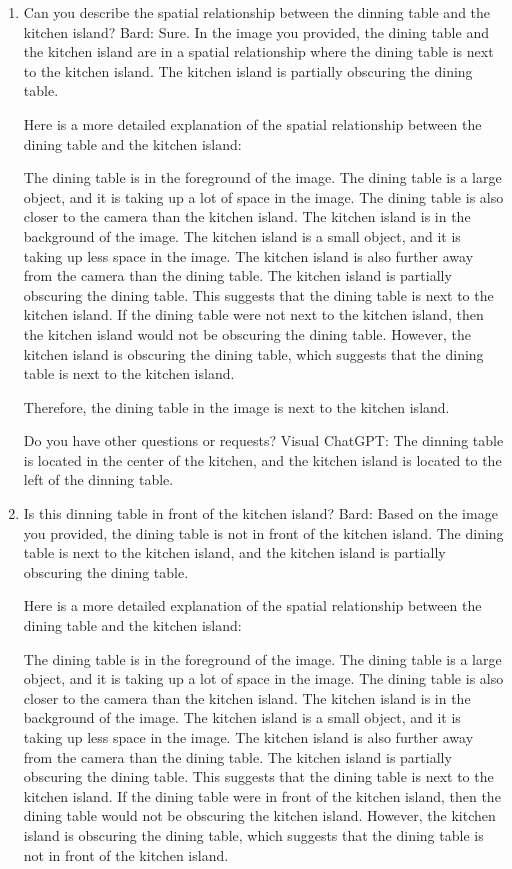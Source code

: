 \begin{enumerate}
    \item Can you describe the spatial relationship between the dinning table and the kitchen island?
    \subitem Bard: 
    Sure. In the image you provided, the dining table and the kitchen island are in a spatial relationship where the dining table is next to the kitchen island. The kitchen island is partially obscuring the dining table.
    
    Here is a more detailed explanation of the spatial relationship between the dining table and the kitchen island:
    
    The dining table is in the foreground of the image. The dining table is a large object, and it is taking up a lot of space in the image. The dining table is also closer to the camera than the kitchen island.
    The kitchen island is in the background of the image. The kitchen island is a small object, and it is taking up less space in the image. The kitchen island is also further away from the camera than the dining table.
    The kitchen island is partially obscuring the dining table. This suggests that the dining table is next to the kitchen island.
    If the dining table were not next to the kitchen island, then the kitchen island would not be obscuring the dining table. However, the kitchen island is obscuring the dining table, which suggests that the dining table is next to the kitchen island.
    
    Therefore, the dining table in the image is next to the kitchen island.
    
    Do you have other questions or requests?
    \subitem Visual ChatGPT: The dinning table is located in the center of the kitchen, and the kitchen island is located to the left of the dinning table.
    \item Is this dinning table in front of the kitchen island?
    \subitem Bard: Based on the image you provided, the dining table is not in front of the kitchen island. The dining table is next to the kitchen island, and the kitchen island is partially obscuring the dining table.

    Here is a more detailed explanation of the spatial relationship between the dining table and the kitchen island:
    
    The dining table is in the foreground of the image. The dining table is a large object, and it is taking up a lot of space in the image. The dining table is also closer to the camera than the kitchen island.
    The kitchen island is in the background of the image. The kitchen island is a small object, and it is taking up less space in the image. The kitchen island is also further away from the camera than the dining table.
    The kitchen island is partially obscuring the dining table. This suggests that the dining table is next to the kitchen island.
    If the dining table were in front of the kitchen island, then the dining table would not be obscuring the kitchen island. However, the kitchen island is obscuring the dining table, which suggests that the dining table is not in front of the kitchen island.
    

\end{enumerate}
